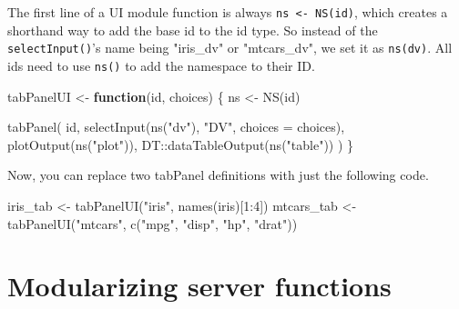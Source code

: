 \documentclass[
  oneside]{book}
\newenvironment{Shaded}{\begin{snugshade}}{\end{snugshade}}
\newcommand{\AttributeTok}[1]{\textcolor[rgb]{0.77,0.63,0.00}{#1}}
\newcommand{\ControlFlowTok}[1]{\textcolor[rgb]{0.13,0.29,0.53}{\textbf{#1}}}
\newcommand{\DecValTok}[1]{\textcolor[rgb]{0.00,0.00,0.81}{#1}}
\newcommand{\FunctionTok}[1]{\textcolor[rgb]{0.00,0.00,0.00}{#1}}
\newcommand{\NormalTok}[1]{#1}
\newcommand{\OtherTok}[1]{\textcolor[rgb]{0.56,0.35,0.01}{#1}}
\newcommand{\SpecialCharTok}[1]{\textcolor[rgb]{0.00,0.00,0.00}{#1}}
\newcommand{\StringTok}[1]{\textcolor[rgb]{0.31,0.60,0.02}{#1}}
\begin{document}
The first line of a UI module function is always \texttt{ns\ \textless{}-\ NS(id)}, which creates a shorthand way to add the base id to the id type. So instead of the \texttt{selectInput}\texttt{()}'s name being \StringTok{"iris\_dv"} or \StringTok{"mtcars\_dv"}, we set it as \texttt{ns}\texttt{(dv)}. All ids need to use \texttt{ns}\texttt{()} to add the namespace to their ID.

\begin{Shaded}
\begin{Highlighting}[]
\NormalTok{tabPanelUI }\OtherTok{\textless{}{-}} \ControlFlowTok{function}\NormalTok{(id, choices) \{}
\NormalTok{    ns }\OtherTok{\textless{}{-}} \FunctionTok{NS}\NormalTok{(id)}
    
    \FunctionTok{tabPanel}\NormalTok{(}
\NormalTok{        id,}
        \FunctionTok{selectInput}\NormalTok{(}\FunctionTok{ns}\NormalTok{(}\StringTok{"dv"}\NormalTok{), }\StringTok{"DV"}\NormalTok{, }\AttributeTok{choices =}\NormalTok{ choices),}
        \FunctionTok{plotOutput}\NormalTok{(}\FunctionTok{ns}\NormalTok{(}\StringTok{"plot"}\NormalTok{)),}
\NormalTok{        DT}\SpecialCharTok{::}\FunctionTok{dataTableOutput}\NormalTok{(}\FunctionTok{ns}\NormalTok{(}\StringTok{"table"}\NormalTok{))}
\NormalTok{    )}
\NormalTok{\}}
\end{Highlighting}
\end{Shaded}

Now, you can replace two tabPanel definitions with just the following code.

\begin{Shaded}
\begin{Highlighting}[]
\NormalTok{iris\_tab }\OtherTok{\textless{}{-}} \FunctionTok{tabPanelUI}\NormalTok{(}\StringTok{"iris"}\NormalTok{, }\FunctionTok{names}\NormalTok{(iris)[}\DecValTok{1}\SpecialCharTok{:}\DecValTok{4}\NormalTok{])}
\NormalTok{mtcars\_tab }\OtherTok{\textless{}{-}} \FunctionTok{tabPanelUI}\NormalTok{(}\StringTok{"mtcars"}\NormalTok{, }\FunctionTok{c}\NormalTok{(}\StringTok{"mpg"}\NormalTok{, }\StringTok{"disp"}\NormalTok{, }\StringTok{"hp"}\NormalTok{, }\StringTok{"drat"}\NormalTok{))}
\end{Highlighting}
\end{Shaded}

\hypertarget{modularizing-server-functions}{%
\section{Modularizing server functions}\label{modularizing-server-functions}}
\end{document}

